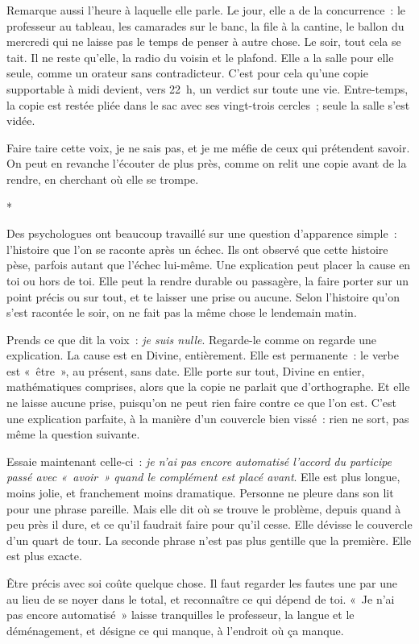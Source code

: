 \documentclass[10.5pt,twoside,openright]{book}
\newcommand{\asterisme}{\par\vspace{0.7em}\centerline{\color{gris}*\quad*\quad*}\vspace{0.7em}\par\noindent}
\begin{document}
Remarque aussi l’heure à laquelle elle parle. Le jour, elle a de la concurrence : le professeur au tableau, les camarades sur le banc, la file à la cantine, le ballon du mercredi qui ne laisse pas le temps de penser à autre chose. Le soir, tout cela se tait. Il ne reste qu’elle, la radio du voisin et le plafond. Elle a la salle pour elle seule, comme un orateur sans contradicteur. C’est pour cela qu’une copie supportable à midi devient, vers 22 h, un verdict sur toute une vie. Entre-temps, la copie est restée pliée dans le sac avec ses vingt-trois cercles ; seule la salle s’est vidée.

Faire taire cette voix, je ne sais pas, et je me méfie de ceux qui prétendent savoir. On peut en revanche l’écouter de plus près, comme on relit une copie avant de la rendre, en cherchant où elle se trompe.

\asterisme

Des psychologues ont beaucoup travaillé sur une question d’apparence simple : l’histoire que l’on se raconte après un échec. Ils ont observé que cette histoire pèse, parfois autant que l’échec lui-même. Une explication peut placer la cause en toi ou hors de toi. Elle peut la rendre durable ou passagère, la faire porter sur un point précis ou sur tout, et te laisser une prise ou aucune. Selon l’histoire qu’on s’est racontée le soir, on ne fait pas la même chose le lendemain matin.

Prends ce que dit la voix : \emph{je suis nulle}. Regarde-le comme on regarde une explication. La cause est en Divine, entièrement. Elle est permanente : le verbe est « être », au présent, sans date. Elle porte sur tout, Divine en entier, mathématiques comprises, alors que la copie ne parlait que d’orthographe. Et elle ne laisse aucune prise, puisqu’on ne peut rien faire contre ce que l’on est. C’est une explication parfaite, à la manière d’un couvercle bien vissé : rien ne sort, pas même la question suivante.

Essaie maintenant celle-ci : \emph{je n’ai pas encore automatisé l’accord du participe passé avec « avoir » quand le complément est placé avant}. Elle est plus longue, moins jolie, et franchement moins dramatique. Personne ne pleure dans son lit pour une phrase pareille. Mais elle dit où se trouve le problème, depuis quand à peu près il dure, et ce qu’il faudrait faire pour qu’il cesse. Elle dévisse le couvercle d’un quart de tour. La seconde phrase n’est pas plus gentille que la première. Elle est plus exacte.

Être précis avec soi coûte quelque chose. Il faut regarder les fautes une par une au lieu de se noyer dans le total, et reconnaître ce qui dépend de toi. « Je n’ai pas encore automatisé » laisse tranquilles le professeur, la langue et le déménagement, et désigne ce qui manque, à l’endroit où ça manque.
\end{document}

